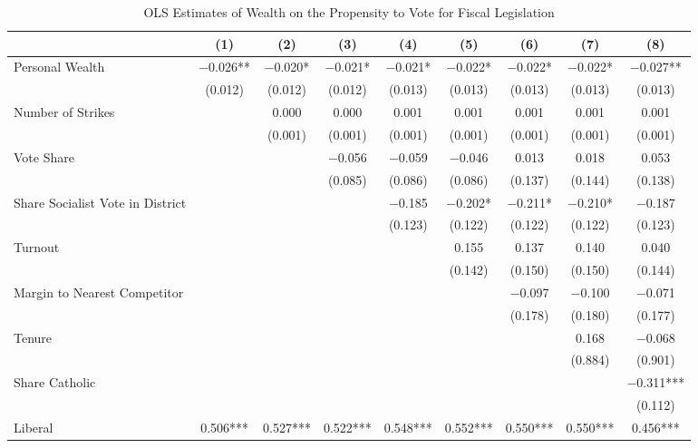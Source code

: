\begin{table}

\caption{\label{tab:ols_controls}OLS Estimates of Wealth on the Propensity to Vote for Fiscal Legislation}
\centering
\begin{tabular}[t]{lcccccccc}
\toprule
  & (1) & (2) & (3) & (4) & (5) & (6) & (7) & (8)\\
\midrule
Personal Wealth & \num{-0.026}** & \num{-0.020}* & \num{-0.021}* & \num{-0.021}* & \num{-0.022}* & \num{-0.022}* & \num{-0.022}* & \num{-0.027}**\\
 & (\num{0.012}) & (\num{0.012}) & (\num{0.012}) & (\num{0.013}) & (\num{0.013}) & (\num{0.013}) & (\num{0.013}) & (\num{0.013})\\
Number of Strikes &  & \num{0.000} & \num{0.000} & \num{0.001} & \num{0.001} & \num{0.001} & \num{0.001} & \num{0.001}\\
 &  & (\num{0.001}) & (\num{0.001}) & (\num{0.001}) & (\num{0.001}) & (\num{0.001}) & (\num{0.001}) & (\num{0.001})\\
Vote Share &  &  & \num{-0.056} & \num{-0.059} & \num{-0.046} & \num{0.013} & \num{0.018} & \num{0.053}\\
 &  &  & (\num{0.085}) & (\num{0.086}) & (\num{0.086}) & (\num{0.137}) & (\num{0.144}) & (\num{0.138})\\
Share Socialist Vote in District &  &  &  & \num{-0.185} & \num{-0.202}* & \num{-0.211}* & \num{-0.210}* & \num{-0.187}\\
 &  &  &  & (\num{0.123}) & (\num{0.122}) & (\num{0.122}) & (\num{0.122}) & (\num{0.123})\\
Turnout &  &  &  &  & \num{0.155} & \num{0.137} & \num{0.140} & \num{0.040}\\
 &  &  &  &  & (\num{0.142}) & (\num{0.150}) & (\num{0.150}) & (\num{0.144})\\
Margin to Nearest Competitor &  &  &  &  &  & \num{-0.097} & \num{-0.100} & \num{-0.071}\\
 &  &  &  &  &  & (\num{0.178}) & (\num{0.180}) & (\num{0.177})\\
Tenure &  &  &  &  &  &  & \num{0.168} & \num{-0.068}\\
 &  &  &  &  &  &  & (\num{0.884}) & (\num{0.901})\\
Share Catholic &  &  &  &  &  &  &  & \num{-0.311}***\\
 &  &  &  &  &  &  &  & (\num{0.112})\\
Liberal & \num{0.506}*** & \num{0.527}*** & \num{0.522}*** & \num{0.548}*** & \num{0.552}*** & \num{0.550}*** & \num{0.550}*** & \num{0.456}***\\

\end{tabular}
\end{table}
